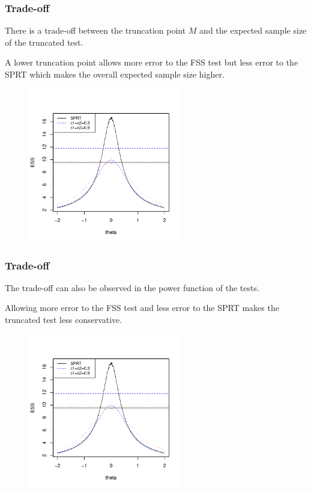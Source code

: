 \documentclass[10pt]{beamer}
\begin{document}
\begin{frame}
\frametitle{Trade-off}

There is a trade-off between the truncation point $M$ and the expected sample size of the truncated test.

A lower truncation point allows more error to the FSS test but less error to the SPRT which makes the overall expected sample size higher.

\begin{figure}
\centering
\includegraphics[height=0.6\textheight, width=0.6\textwidth]{trade-off.pdf}
\end{figure}

\end{frame}

\begin{frame}
\frametitle{Trade-off}

The trade-off can also be observed in the power function of the tests.

Allowing more error to the FSS test and less error to the SPRT makes the truncated test less conservative.

\begin{figure}
\centering
\includegraphics[height=0.6\textheight, width=0.6\textwidth]{trade-off.pdf}
\end{figure}

\end{frame}
\end{document}
